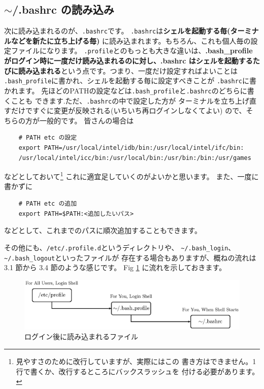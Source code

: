 \documentclass[a4j]{ltjreport}
\begin{document}
    \subsection{\texorpdfstring{$\sim$/.bashrc の読み込み}{~/.bashrc の読み込み}}
    次に読み込まれるのが、\verb+.bashrc+です。
    \verb+.bashrc+は\textbf{シェルを起動する毎(ターミナルなどを新たに立ち上げる毎)}
    に読み込まれます。もちろん、これも個人毎の設定ファイルになります。
    \verb+.profile+とのもっとも大きな違いは、\textbf{.bash\_profile
    がログイン時に一度だけ読み込まれるのに対し、.bashrc はシェルを起動するた
    びに読み込まれる}という点です。つまり、一度だけ設定すればよいことは
    \verb+.bash_profile+に書かれ、シェルを起動する毎に設定すべきことが
    \verb+.bashrc+に書かれます。
    先ほどのPATHの設定などは\verb+.bash_profile+と\verb+.bashrc+のどちらに書くことも
    できます.ただ、\verb+.bashrc+の中で設定した方が
    ターミナルを立ち上げ直すだけですぐに変更が反映される(いちいち再ログインしなくてよい)
    ので、そちらの方が一般的です。
    皆さんの場合は
    \begin{verbatim}
    # PATH etc の設定
    export PATH=/usr/local/intel/idb/bin:/usr/local/intel/ifc/bin:
    /usr/local/intel/icc/bin:/usr/local/bin:/usr/bin:/bin:/usr/games
    \end{verbatim}
    などとしておいて\footnote{見やすさのために改行していますが、実際にはこの
    書き方はできません。1行で書くか、改行するところにバックスラッシュを
    付ける必要があります。}
    これに適宜足していくのがよいかと思います。
    また、一度に書かずに
    \begin{verbatim}
    # PATH etc の追加
    export PATH=$PATH:<追加したいパス>
    \end{verbatim}
    などとして、これまでのパスに順次追加することもできます。
    \vspace*{3mm}

    その他にも、\verb+/etc/.profile.d+というディレクトリや、
    \verb+~/.bash_login+、\verb+~/.bash_logout+といったファイルが
    存在する場合もありますが、概ねの流れは 3.1 節から 3.4 節のような感じです。
    Fig \ref{fig:login} に流れを示しておきます。

    \begin{figure}[htbp]
        \centering
        \includegraphics[width=150mm]{Fig/login.eps}
        \caption{ログイン後に読み込まれるファイル}
        \label{fig:login}
    \end{figure}
\end{document}
